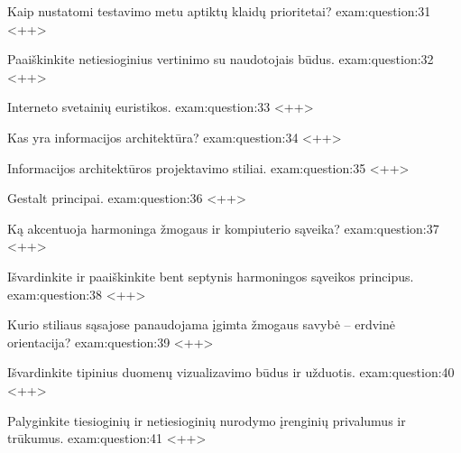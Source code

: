 \begin{question}{%
  Kaip nustatomi testavimo metu aptiktų klaidų prioritetai?
  }{exam:question:31}
  <++>
\end{question}

\begin{question}{%
  Paaiškinkite netiesioginius vertinimo su naudotojais būdus.
  }{exam:question:32}
  <++>
\end{question}

\begin{question}{%
  Interneto svetainių euristikos.
  }{exam:question:33}
  <++>
\end{question}

\begin{question}{%
  Kas yra informacijos architektūra?
  }{exam:question:34}
  <++>
\end{question}

\begin{question}{%
  Informacijos architektūros projektavimo stiliai.
  }{exam:question:35}
  <++>
\end{question}

\begin{question}{%
  Gestalt principai.
  }{exam:question:36}
  <++>
\end{question}

\begin{question}{%
  Ką akcentuoja harmoninga žmogaus ir kompiuterio sąveika?
  }{exam:question:37}
  <++>
\end{question}

\begin{question}{%
  Išvardinkite ir paaiškinkite bent septynis harmoningos sąveikos
  principus.
  }{exam:question:38}
  <++>
\end{question}

\begin{question}{%
  Kurio stiliaus sąsajose panaudojama įgimta žmogaus savybė – erdvinė
  orientacija?
  }{exam:question:39}
  <++>
\end{question}

\begin{question}{%
  Išvardinkite tipinius duomenų vizualizavimo būdus ir užduotis.
  }{exam:question:40}
  <++>
\end{question}

\begin{question}{%
  Palyginkite tiesioginių ir netiesioginių nurodymo įrenginių privalumus
  ir trūkumus.
  }{exam:question:41}
  <++>
\end{question}

